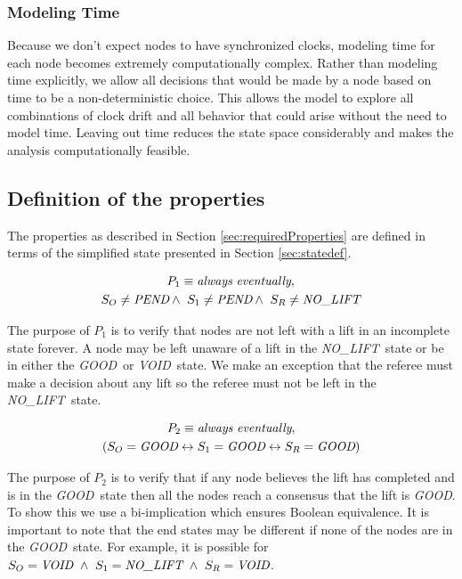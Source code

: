 \documentclass[runningheads]{llncs}
\newcommand{\originatorstate}{S_O}
\newcommand{\relayastate}{S_1}
\newcommand{\refstate}{S_R}
\newcommand{\nolift}{\emph{NO\_LIFT}}
\newcommand{\pend}{\emph{PEND}}
\newcommand{\void}{\emph{VOID}}
\newcommand{\good}{\emph{GOOD}}
\newcommand{\always}{\emph{always}}
\newcommand{\eventually}{\emph{eventually}}
\newcommand{\secref}[1]{Section \ref{#1}}
\newif\ifcomments
\newif\ifkylecomments
\newcommand{\egm}[1]{\ifcomments\textcolor{orange}{egm: #1}\fi}
\newcommand{\krs}[1]{\ifkylecomments\textcolor{blue}{krs: #1}\fi}
\begin{document}
\subsubsection{Modeling Time}
\label{sec:model_time}
Because we don't expect nodes to have synchronized clocks, modeling time for each node becomes extremely computationally complex. Rather than modeling time explicitly, we allow all decisions that would be made by a node based on time to be a non-deterministic choice. This allows the model to explore all combinations of clock drift and all behavior that could arise without the need to model time. Leaving out time reduces the state space considerably and makes the analysis computationally feasible. 

\subsection{Definition of the properties}
\krs{Very nice. Got a big list of latex macros now \egm{The following is an example of why the \emph{secref} macro is useful. Here section is lowercase and I think previously it was uppercase}.}
The properties as described in \secref{sec:requiredProperties} are defined in terms of the simplified state presented in \secref{sec:statedef}. 

\begin{definition}[Property 1]
\begin{multline*}
    P_1 \equiv \always\ \eventually,\\
    \originatorstate \neq \pend \wedge\ \relayastate \neq \pend \wedge\ \refstate \neq \nolift\\
\end{multline*}
\end{definition}
The purpose of $P_1$ is to verify that nodes are not left with a lift in an incomplete state forever. A node may be left unaware of a lift in the \nolift\ state or be in either the \good\ or \void\ state. We make an exception that the referee must make a decision about any lift so the referee must not be left in the \nolift\ state. 

\begin{definition}[Property 2]
    
\begin{multline*}
P_2 \equiv \always\ \eventually, \\
    (\originatorstate = \good \leftrightarrow \relayastate = \good \leftrightarrow \refstate = \good) \\
\end{multline*}
\end{definition}
The purpose of $P_2$ is to verify that if any node believes the lift has completed and is in the \good\ state then all the nodes reach a consensus that the lift is \good. To show this we use a bi-implication which ensures Boolean equivalence. It is important to note that the end states may be different if none of the nodes are in the \good\ state. For example, it is possible for $\originatorstate = \void\ \wedge\ \relayastate = \nolift\ \wedge\ \refstate = \void$.
\end{document}
